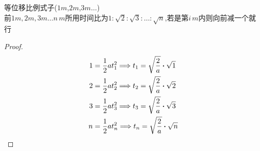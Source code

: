 \documentclass{article}
\begin{document}
    \begin{corollary*}
        等位移比例式子($1m$,$2m$,$3m \dots$)    \\
        前$1m,2m,3m \dots n \, m$所用时间比为$1:\sqrt{2}:\sqrt{3}:\dots:\sqrt{n}$,若是第$i\,m$内则向前减一个就行
        \begin{proof}
            \begin{align*}
                1 &= \frac{1}{2}a t_{1}^{2} \lra t_{1} =\sqrt{\frac{2}{a}} \vdot \sqrt{1}     \\
                2 &= \frac{1}{2}a t_{2}^{2} \lra t_{2} =\sqrt{\frac{2}{a}} \vdot \sqrt{2}     \\
                3 &= \frac{1}{2}a t_{3}^{2} \lra t_{3} =\sqrt{\frac{2}{a}} \vdot \sqrt{3}     \\  
                n &= \frac{1}{2}a t_{n}^{2} \lra t_{n} =\sqrt{\frac{2}{a}} \vdot \sqrt{n}     \\
            \end{align*}
            
            
            
        \end{proof}
    \end{corollary*}
    

    


    
\end{document}
